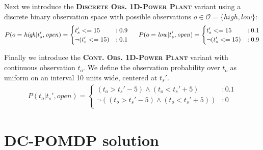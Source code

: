 \documentclass{article} %
\newcommand{\open}{\mathit{open}}
\newcommand{\close}{\mathit{close}}
\newcommand{\high}{\mathit{high}}
\newcommand{\low}{\mathit{low}}
\begin{document}
Next we introduce the \textsc{\bf Discrete Obs. 1D-Power Plant} variant using 
a discrete binary observation space with possible
observations $o \in \mathcal{O} = \{\high,\low\}$:
{\footnotesize
\vspace{-1mm}
\begin{align}
P(o=\high|t_s',\open) = 
\begin{cases}
  t_s' <= 15 &: 0.9 \\
 \neg (t_s' <= 15)&: 0.1 \\
\end{cases}
\hspace{5mm}
P(o=\low|t_s',\open) = 
\begin{cases}
 t_s' <= 15 &: 0.1 \\
 \neg (t_s' <= 15) &: 0.9 \\
\end{cases}
\end{align}
\vspace{-3mm}
}

Finally we introduce the \textsc{\bf Cont. Obs. 1D-Power Plant}
variant with continuous observation $t_o$.  
We define the observation probability over $t_o$ as uniform on
an interval 10 units wide, centered at $t_s'$.
{\footnotesize
\begin{align}
P(t_o|t_s',\open) = 
\begin{cases}
 (t_o>t_s'-5) \wedge (t_o<t_s'+5) &: 0.1 \\
 \neg((t_o>t_s'-5) \wedge (t_o<t_s'+5)) &: 0 \\
\end{cases}
\end{align}
}

\section{DC-POMDP solution}
\end{document}
